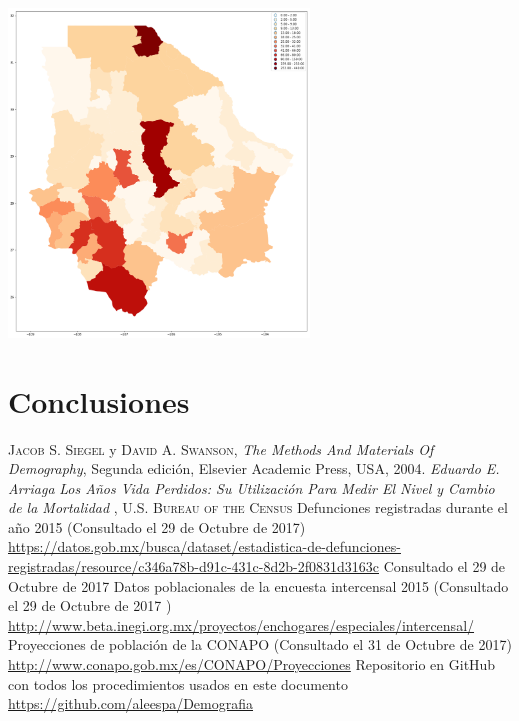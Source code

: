 \documentclass[fontsize=11pt]{article}
\begin{document}
\begin{center}
\includegraphics[width=0.6\textwidth]{map}
\end{center}
\section*{Conclusiones}
\begin{thebibliography}{X}
 \textsc{Jacob S. Siegel} y \textsc{David A. Swanson}, \textit{The Methods And
Materials Of Demography}, Segunda edición,
Elsevier Academic Press, USA, 2004.
 \textit{Eduardo E. Arriaga}\textit{ Los Años Vida Perdidos: Su Utilización Para Medir El Nivel y Cambio de la Mortalidad} , \textsc{U.S. Bureau of the Census} 
 Defunciones registradas durante el año 2015 (Consultado el 29 de Octubre de 2017)  \url{https://datos.gob.mx/busca/dataset/estadistica-de-defunciones-registradas/resource/c346a78b-d91c-431c-8d2b-2f0831d3163c} Consultado el 29 de Octubre de 2017 
 Datos poblacionales de la encuesta intercensal 2015 (Consultado el 29 de Octubre de 2017 ) \url{http://www.beta.inegi.org.mx/proyectos/enchogares/especiales/intercensal/} 
 Proyecciones de población de la CONAPO (Consultado el 31 de Octubre de 2017) \url{http://www.conapo.gob.mx/es/CONAPO/Proyecciones} 
 Repositorio en GitHub con todos los procedimientos usados en este documento \url{https://github.com/aleespa/Demografia}
\end{thebibliography}
\end{document}
